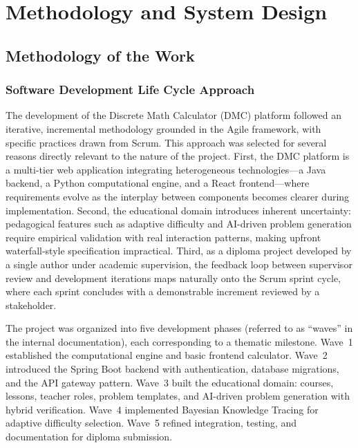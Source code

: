 
\chapter{Methodology and System Design}
\label{ch:methodology}

\section{Methodology of the Work}
\label{sec:methodology}

\subsection{Software Development Life Cycle Approach}
\label{subsec:sdlc}

The development of the Discrete Math Calculator (DMC) platform followed an iterative, incremental methodology grounded in the Agile framework, with specific practices drawn from Scrum. This approach was selected for several reasons directly relevant to the nature of the project. First, the DMC platform is a multi-tier web application integrating heterogeneous technologies---a Java backend, a Python computational engine, and a React frontend---where requirements evolve as the interplay between components becomes clearer during implementation. Second, the educational domain introduces inherent uncertainty: pedagogical features such as adaptive difficulty and AI-driven problem generation require empirical validation with real interaction patterns, making upfront waterfall-style specification impractical. Third, as a diploma project developed by a single author under academic supervision, the feedback loop between supervisor review and development iterations maps naturally onto the Scrum sprint cycle, where each sprint concludes with a demonstrable increment reviewed by a stakeholder.

The project was organized into five development phases (referred to as ``waves'' in the internal documentation), each corresponding to a thematic milestone. Wave~1 established the computational engine and basic frontend calculator. Wave~2 introduced the Spring Boot backend with authentication, database migrations, and the API gateway pattern. Wave~3 built the educational domain: courses, lessons, teacher roles, problem templates, and AI-driven problem generation with hybrid verification. Wave~4 implemented Bayesian Knowledge Tracing for adaptive difficulty selection. Wave~5 refined integration, testing, and documentation for diploma submission.

